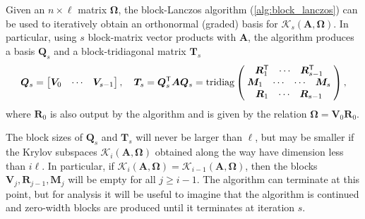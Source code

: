 Given an $n\times \ell$ matrix $\bm{\Omega}$, the block-Lanczos algorithm (\cref{alg:block_lanczos}) can be used to iteratively obtain an orthonormal (graded) basis for $\mathcal{K}_{s}(\bm{A},\bm{\Omega})$. 
In particular, using $s$ block-matrix vector products with $\bm{A}$, the algorithm produces a basis $\bm{Q}_s$ and a block-tridiagonal matrix $\bm{T}_s$ 
\begin{equation}\label{eqn:QTdef}
\bm{Q}_s = 
    \begin{bmatrix} \bm{V}_0 & \cdots & \bm{V}_{s-1} \end{bmatrix}
,\quad
    \bm{T}_s = \bm{Q}_s^{\textsf{\textup{T}}} \bm{A}\bm{Q}_s = 
    \operatorname{tridiag}
    \left(\hspace{-.75em} \begin{array}{c}
        \begin{array}{cccc} \bm{R}_1^{\textsf{\textup{T}}}  & \cdots & \bm{R}_{s-1}^{\textsf{\textup{T}}} \end{array} \\
            \begin{array}{ccccc} \bm{M}_1 & \cdots & \cdots & \bm{M}_{s} \end{array} \\
        \begin{array}{cccc} \bm{R}_1 & \cdots & \bm{R}_{s-1}  \end{array} 
    \end{array} \hspace{-.75em}\right),
\end{equation}
where $\bm{R}_0$ is also output by the algorithm and is given by the relation $\bm{\Omega} = \bm{V}_0 \bm{R}_0$. 
\begin{remark}
The block sizes of $\bm{Q}_s$ and $\bm{T}_s$ will never be larger than $\ell$, but may be smaller if the Krylov subspaces $\mathcal{K}_{i}(\bm{A},\bm{\Omega})$ obtained along the way have dimension less than $i\ell$. 
In particular, if $\mathcal{K}_{i}(\bm{A},\bm{\Omega}) = \mathcal{K}_{i-1}(\bm{A},\bm{\Omega})$, then the blocks $\bm{V}_j, \bm{R}_{j-1}, \bm{M}_{j}$ will be empty for all $j \geq i-1$.
The algorithm can terminate at this point, but for analysis it will be useful to imagine that the algorithm is continued and zero-width blocks are produced until it terminates at iteration $s$.
\end{remark}

